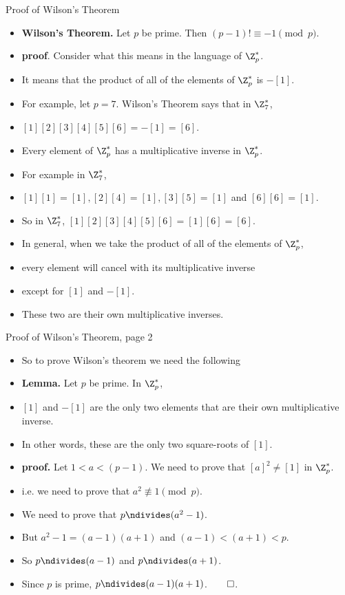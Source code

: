 \documentclass[handout]{beamer}
\begin{document}
\begin{frame}{Proof of Wilson's Theorem}

\begin{itemize}
  \item \textbf{Wilson's Theorem.} Let $p$ be prime. Then $(p-1)! \equiv -1 \pmod p$.
  \item \textbf{proof}. Consider what this means in the language of $\Z_p^*$.
  \item It means that the product of all of the elements of $\Z_p^*$ is $-[1]$.
  \item For example, let $p=7$. Wilson's Theorem says that in $\Z_7^*$,
  \item $[1][2][3][4][5][6] = -[1] = [6]$.
  \item Every element of $\Z_p^*$ has a multiplicative inverse in $\Z_p^*$.
  \item For example in $\Z_7^*$,
  \item $[1][1]=[1], [2][4]=[1],[3][5]=[1]$ and $[6][6] = [1]$.
  \item So in $\Z_7^*$, $[1][2][3][4][5][6] = [1][6] = [6]$.
  \item In general, when we take the product of all of the elements of $\Z_p^*$,
  \item every element will cancel with its multiplicative inverse
  \item except for $[1]$ and $-[1]$.
  \item These two are their own multiplicative inverses.
\end{itemize}

\end{frame}

\begin{frame}{Proof of Wilson's Theorem, page 2}
\begin{itemize}
  \item So to prove Wilson's theorem we need the following
  \item \textbf{Lemma.} Let $p$ be prime. In $\Z_p^*$,
  \item $[1]$ and $-[1]$ are the only two elements that are their own multiplicative inverse.
  \item In other words, these are the only two square-roots of $[1]$.
  \item \textbf{proof.} Let $1<a<(p-1)$. We need to prove that $[a]^2 \neq [1]$ in $\Z_p^*$.
  \item i.e. we need to prove that $a^2 \not\equiv 1 \pmod p$.
  \item We need to prove that $p\ndivides (a^2 - 1)$.
  \item But $a^2 - 1 = (a-1)(a+1)$ and $(a-1)<(a+1)<p$.
  \item So $p\ndivides (a-1)$ and $p\ndivides (a+1)$.
  \item Since $p$ is prime, $p\ndivides (a-1)(a+1)$.$\qed$.
\end{itemize}

\end{frame}
\end{document}

